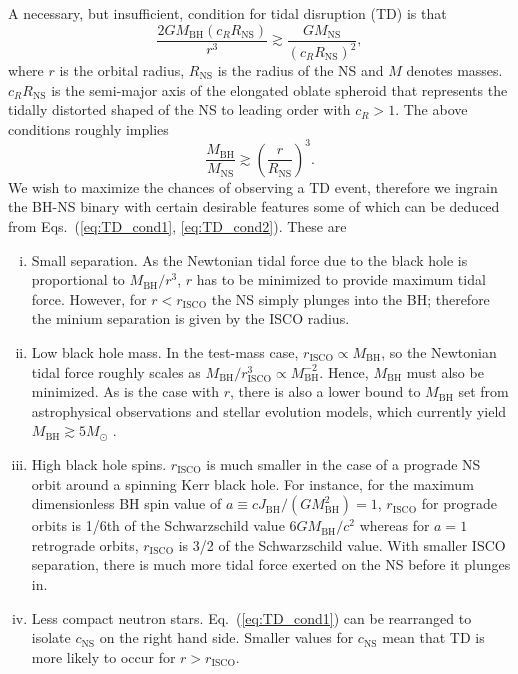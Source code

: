 \documentclass[prd,amsmath,amssymb,aps,floats,amsfonts,notitlepage,superscriptaddress,eqsecnum,nofootinbib,10pt]{revtex4-1}
\newcommand{\f}{\frac}
\newcommand{\be}{\begin{equation}}
\newcommand{\ee}{\end{equation}}
\begin{document}
A necessary, but insufficient, condition for tidal disruption (TD) is that
\be
\f{2 G M_\text{BH} (c_R R_\text{NS})}{r^3} \gtrsim \f{G M_\text{NS}}{(c_R R_\text{NS})^2} \label{eq:TD_cond1},
\ee
where $r$ is the orbital radius, $R_\text{NS}$ is the radius of the NS and $M$ denotes masses. 
$c_R R_\text{NS}$ is the semi-major axis of the elongated oblate spheroid that represents the tidally distorted shaped of the NS to leading order with
$c_R >1 $. %
The above conditions roughly implies
%
\be
\f{M_\text{BH}}{M_\text{NS}} \gtrsim \left(\f{r}{R_\text{NS}}\right)^3 \label{eq:TD_cond2}.
\ee
%
We wish to maximize the chances of observing a TD event, therefore we ingrain the BH-NS binary with certain desirable features
some of which can be deduced from Eqs.~(\ref{eq:TD_cond1}, \ref{eq:TD_cond2}). These are
%
%
\begin{enumerate}[(i)]
 \item Small separation. As the Newtonian tidal force due to the black hole is proportional to $M_\text{BH}/r^3$, $r$ has to be
 minimized to provide maximum tidal force. 
 However, for $r< r_\text{ISCO}$ the NS simply plunges into the BH; therefore the minium separation is given by the ISCO radius.
 \item Low black hole mass. In the test-mass case, $r_\text{ISCO} \propto M_\text{BH}$, so the Newtonian tidal force roughly scales as $M_\text{BH}/r_\text{ISCO}^3\propto M_\text{BH}^{-2}$. 
 Hence, $M_\text{BH}$ must also be minimized. 
 As is the case with $r$, there is also a lower bound to $M_\text{BH}$ set from astrophysical observations and stellar evolution models, which currently yield $M_\text{BH} \gtrsim 5 M_\odot$ \cite{Farr:2010tu, Raithel:2017nlc, Ozel:2010su, Wiktorowicz:2013dua, Christian:2018mjv}.
 \item High black hole spins. $r_\text{ISCO}$ is much smaller in the case of a prograde NS orbit around a spinning Kerr black hole.
 For instance, for the maximum dimensionless BH spin value of $a\equiv c J_\text{BH}/(G M^2_\text{BH})=1$, $r_\text{ISCO}$ for prograde orbits is 1/6th of the Schwarzschild value $6GM_\text{BH}/c^2$ whereas for $a=1$ retrograde orbits, $r_\text{ISCO}$ is 3/2 of the Schwarzschild value.
 With smaller ISCO separation, there is much more tidal force exerted on the NS before it plunges in.
 \item Less compact neutron stars. Eq.~(\ref{eq:TD_cond1}) can be rearranged to isolate $c_\text{NS}$
 on the right hand side. Smaller values for $c_\text{NS}$ mean that TD is more likely to occur for $r>r_\text{ISCO}$.
\end{enumerate}
%
\end{document}
